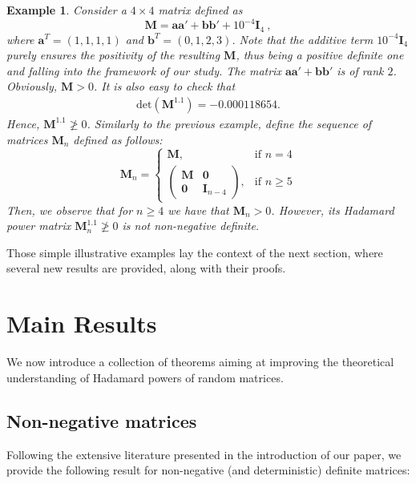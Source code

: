 \documentclass[conference,letterpaper]{IEEEtran}
\numberwithin{equation}{section}
\newcommand{\lbl}{\label}
\newcommand{\beaa}{\begin{eqnarray*}}
\newcommand{\eeaa}{\end{eqnarray*}}
\newtheorem{example}{{\sc Example}}[section]
\begin{document}
\medskip

\begin{example}\lbl{good_example} 
Consider a $4\times 4$ matrix defined as 
$$\mathbf{M}=\mathbf{a}\mathbf{a}'+\mathbf{b}\mathbf{b}' + 10^{-4}\mathbf{I}_4 \ ,$$ 
where $\mathbf{a}^T=(1,1,1,1)$ and $\mathbf{b}^T=(0,1,2,3)$. 
Note that the additive term $10^{-4}\mathbf{I}_4$ purely ensures the positivity of the resulting $\mathbf{M}$, thus being a positive definite one and falling into the framework of our study.
The matrix $\mathbf{a}\mathbf{a}'+\mathbf{b}\mathbf{b}'$  is of rank $2$. Obviously, $\mathbf{M}>0$. 
It is also easy to check that
\beaa
\mbox{det}(\mathbf{M}^{1.1})=-0.000118654.
\eeaa
Hence, $\mathbf{M}^{1.1}\ngeqslant 0$.
Similarly to the previous example, define the sequence of matrices $\mathbf{M}_n$ defined as follows:
\[
    \mathbf{M}_n= 
\begin{cases}
    \mathbf{M},& \text{if } n=4\\
    \begin{pmatrix}
\mathbf{M} & \mathbf{0}\\
\mathbf{0} & \mathbf{I}_{n-4}
\end{pmatrix},              & \text{if } n\geq 5
\end{cases}
\]
Then, we observe that for $n\geq 4$ we have that $\mathbf{M}_n>0$. 
However, its Hadamard power matrix $\mathbf{M}_n^{1.1}\ngeqslant 0$ is not non-negative definite.
\end{example}
\medskip
Those simple illustrative examples lay the context of the next section, where several new results are provided, along with their proofs.


\section{Main Results}\lbl{sec:main}

We now introduce a collection of theorems aiming at improving the theoretical understanding of Hadamard powers of random matrices.

\subsection{Non-negative matrices}
Following the extensive literature presented in the introduction of our paper, we provide the following result for non-negative (and deterministic) definite matrices:
\end{document}
